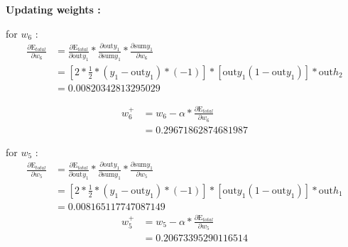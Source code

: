 \documentclass[a4paper, article, oneside, USenglish, IN5460]{memoir}
\begin{document}
{\newline
\textbf{Updating weights :}

for $w_6$ :
\begin{equation}
\begin{aligned}
\frac{\partial \text{E}_{total}  }{\partial w_6} &= 
\frac{\partial \text{E}_{total}}{\partial \text{out}y_1} *\frac{\partial  \text{out}y_1}{\partial \text{sum}y_1}*\frac{\partial \text{sum}y_1}{\partial  w_6}\\
&= [2*\frac{1}{2}*(y_1 -\text{out}y_1)*(-1)] * [\text{out}y_1(1-\text{out}y_1)] *\text{out}h_2 \\
& =0.00820342813295029
\end{aligned}
\end{equation}


\begin{equation}
\begin{aligned}
w^+_6 &= w_6 - \alpha * \frac{\partial \text{E}_{total}  }{\partial w_6} \\
& =  0.29671862874681987
\end{aligned}
\end{equation}


\newline
for $w_5$ :
\begin{equation}
\begin{aligned}
\frac{\partial \text{E}_{total}  }{\partial w_5} &= \frac{\partial \text{E}_{total}}{\partial \text{out}y_1} *\frac{\partial  \text{out}y_1}{\partial \text{sum}y_1}*\frac{\partial \text{sum}y_1}{\partial  w_5}\\
&=[2*\frac{1}{2}*(y_1 -\text{out}y_1)*(-1)] * [\text{out}y_1(1-\text{out}y_1)] *\text{out}h_1 \\
& = 0.008165117747087149

\end{aligned}
\end{equation}
\begin{equation}
\begin{aligned}
w^+_5 &= w_5 - \alpha * \frac{\partial \text{E}_{total}  }{\partial w_5} \\
& = 0.20673395290116514
\end{aligned}
\end{equation}


}
\end{document}
